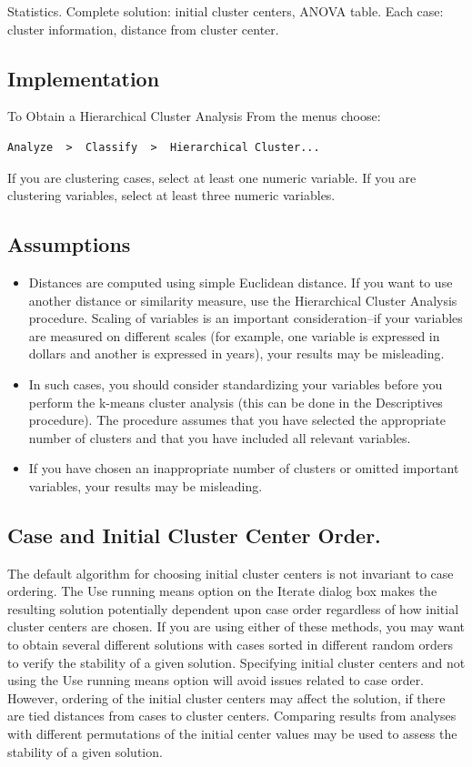 \documentclass[a4paper,12pt]{article}
\begin{document}
Statistics. Complete solution: initial cluster centers, ANOVA table.  Each case: cluster information, distance from cluster center.


\subsection*{Implementation}

To Obtain a Hierarchical Cluster Analysis
From the menus choose:
\begin{verbatim}
Analyze  >  Classify  >  Hierarchical Cluster...

\end{verbatim}
If you are clustering cases, select at least one numeric variable. If you are clustering variables, select at least three numeric variables. 




\subsection*{Assumptions}
\begin{itemize}
	\item  Distances are computed using simple Euclidean distance. If you want to use another distance or similarity measure, use the Hierarchical Cluster Analysis procedure. Scaling of variables is an important consideration--if your variables are measured on different scales (for example, one variable is expressed in dollars and another is expressed in years), your results may be misleading.
	\item  In such cases, you should consider standardizing your variables before you perform the k-means cluster analysis (this can be done in the Descriptives procedure). The procedure assumes that you have selected the appropriate number of clusters and that you have included all relevant variables. 
	\item If you have chosen an inappropriate number of clusters or omitted important variables, your results may be misleading.
\end{itemize}


\subsection*{Case and Initial Cluster Center Order.} The default algorithm for choosing initial cluster centers is not invariant to case ordering. The Use running means option on the Iterate dialog box makes the resulting solution potentially dependent upon case order regardless of how initial cluster centers are chosen. If you are using either of these methods, you may want to obtain several different solutions with cases sorted in different random orders to verify the stability of a given solution. Specifying initial cluster centers and not using the Use running means option will avoid issues related to case order. However, ordering of the initial cluster centers may affect the solution, if there are tied distances from cases to cluster centers. Comparing results from analyses with different permutations of the initial center values may be used to assess the stability of a given solution.
\end{document}
